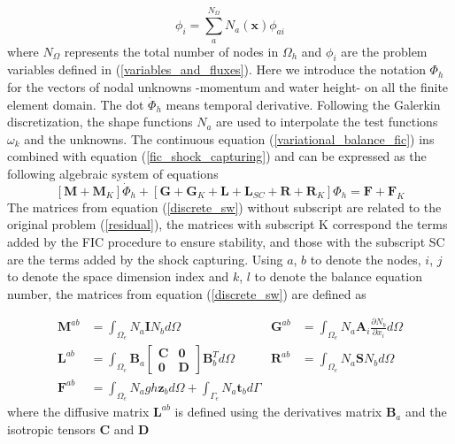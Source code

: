 \documentclass[a4paper,12pt]{article}
\newcommand{\pder}[2]{\frac{\partial#1}{\partial#2}}
\begin{document}
\begin{equation}
\phi_i = \sum_a^{N_\Omega} N_a(\mathbf{x})\phi_{ai}
\end{equation}
where $N_\Omega$ represents the total number of nodes in $\Omega_h$ and $\phi_i$ are the problem variables defined in (\ref{variables_and_fluxes}). Here we introduce the notation $\Phi_h$ for the vectors of nodal unknowns -momentum and water height- on all the finite element domain. The dot $\dot\Phi_h$ means temporal derivative. Following the Galerkin discretization, the shape functions $N_a$ are used to interpolate the test functions $\omega_k$ and the unknowns. The continuous equation (\ref{variational_balance_fic}) ins combined with equation (\ref{fic_shock_capturing}) and can be expressed as the following algebraic system of equations
\begin{equation} \label{discrete_sw}
[\mathbf{M} + \mathbf{M}_K] \dot{\Phi}_h
+ [\mathbf{G} + \mathbf{G}_K + \mathbf{L} + \mathbf{L}_{SC} + \mathbf{R} + \mathbf{R}_K] \Phi_h
= \mathbf{F} + \mathbf{F}_K
\end{equation}
The matrices from equation (\ref{discrete_sw}) without subscript are related to the original problem (\ref{residual}), the matrices with subscript K correspond the terms added by the FIC procedure to ensure stability, and those with the subscript SC are the terms added by the shock capturing. Using $a$, $b$ to denote the nodes, $i$, $j$ to denote the space dimension index and $k$, $l$ to denote the balance equation number, the matrices from equation (\ref{discrete_sw}) are defined as

\begin{align}
    \displaystyle \mathbf{M}^{ab} &= \int_{\Omega_e}N_a \mathbf{I} N_b d\Omega &
    \displaystyle \mathbf{G}^{ab} &= \int_{\Omega_e}
        N_a \mathbf{A}_i \pder{N_b}{x_i} d\Omega \nonumber\\[5pt]
    \displaystyle \mathbf{L}^{ab} &= \int_{\Omega_e}
        \mathbf{B}_a \left[\begin{matrix}
            \mathbf{C} & \mathbf{0} \\ \mathbf{0} & \mathbf{D}
        \end{matrix}\right] \mathbf{B}_b^T d\Omega &
    \displaystyle \mathbf{R}^{ab} &= \int_{\Omega_e} N_a \mathbf{S} N_b d\Omega \\[5pt]
    \displaystyle \mathbf{F}^{ab} &= \int_{\Omega_e} N_a gh\mathbf{z}_b d\Omega +
        \int_{\Gamma_e} N_a \mathbf{t}_b d\Gamma \nonumber
\end{align}
where the diffusive matrix $\mathbf{L}^{ab}$ is defined using the derivatives matrix $\mathbf{B}_a$ and the isotropic tensors $\mathbf{C}$ and $\mathbf{D}$
\end{document}
